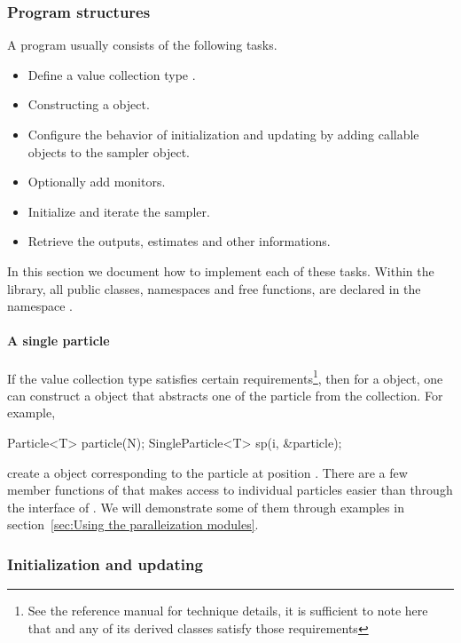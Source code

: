 \subsubsection{Program structures}
\label{ssub:Program structures}

A \vsmc program usually consists of the following tasks.
\begin{itemize}
  \item Define a value collection type .
  \item Constructing a  object.
  \item Configure the behavior of initialization and updating by adding
    callable objects to the sampler object.
  \item Optionally add monitors.
  \item Initialize and iterate the sampler.
  \item Retrieve the outputs, estimates and other informations.
\end{itemize}
In this section we document how to implement each of these tasks. Within the
\vsmc library, all public classes, namespaces and free functions, are declared
in the namespace .

\paragraph{A single particle}

If the value collection type  satisfies certain
requirements\footnote{See the reference manual for technique details, it is
  sufficient to note here that  and any of its derived
  classes satisfy those requirements}, then for a 
object, one can construct a  object that
abstracts one of the particle from the collection. For example,
\begin{cppcode}
Particle<T> particle(N);
SingleParticle<T> sp(i, &particle);
\end{cppcode}
create a  object corresponding to the particle at
position . There are a few member functions of
 that makes access to individual particles easier
than through the interface of . We will demonstrate
some of them through examples in section~\ref{sec:Using the paralleization
  modules}.

\subsubsection{Initialization and updating}
\label{ssub:Initialization and updating}

